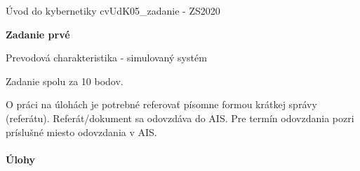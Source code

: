 \documentclass[a4paper, 10pt, ]{article}
\def\oznacenieCasti{cvUdK05\_zadanie - ZS2020}
\begin{document}
\fontsize{12pt}{22pt}\selectfont

\centerline{\textsf{Úvod do kybernetiky} \hfill \textsf{\oznacenieCasti}}

\fontsize{18pt}{22pt}\selectfont





\begin{flushleft}
    \textbf{\textsf{Zadanie prvé}}
\end{flushleft}





\vspace{18pt}

\fontsize{14pt}{18pt}\selectfont

\begin{flushleft}
    Prevodová charakteristika - simulovaný systém
\end{flushleft}




\normalsize






\noindent
Zadanie spolu za 10 bodov.

O práci na úlohách je potrebné referovať písomne formou krátkej správy (referátu). Referát/dokument sa odovzdáva do AIS. Pre termín odovzdania pozri príslušné miesto odovzdania v AIS.





\paragraph{Úlohy}


\medskip
\end{document}

